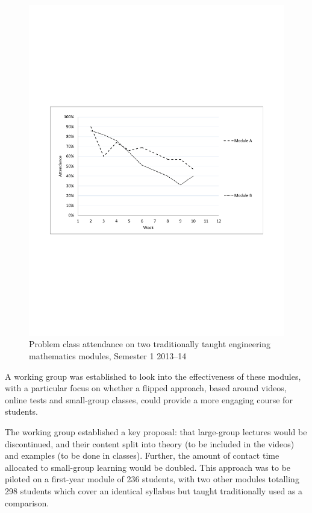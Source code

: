 \documentclass{amsart}
\begin{document}
\begin{center}
\begin{figure}[hbt]
\includegraphics[bb=50 250 562 545,width=1\textwidth]{Figure1.pdf}
\caption{Problem class attendance on two traditionally taught engineering mathematics modules, Semester 1 2013--14}
\end{figure}
\end{center}

A working group was established to look into the effectiveness of these modules, with a particular focus on whether a flipped approach, based around videos, online tests and small-group classes, could provide a more engaging course for students.

The working group established a key proposal: that large-group lectures would be discontinued, and their content split into theory (to be included in the videos) and examples (to be done in classes).  Further, the amount of contact time allocated to small-group learning would be doubled.  This approach was to be piloted on a first-year module of 236 students, with two other modules totalling 298 students which cover an identical syllabus but taught traditionally used as a comparison.
\end{document}
